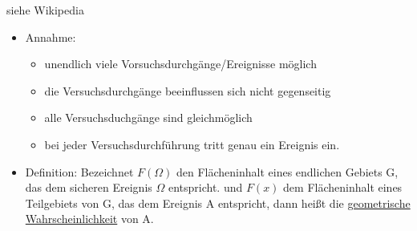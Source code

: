\documentclass{../tudscript}
\begin{document}
siehe Wikipedia

\begin{itemize}
\item Annahme:
\begin{itemize}
\item unendlich viele Vorsuchsdurchgänge/Ereignisse möglich
\item die Versuchsdurchgänge beeinflussen sich nicht gegenseitig
\item alle Versuchsduchgänge sind gleichmöglich
\item bei jeder Versuchsdurchführung tritt genau ein Ereignis ein.
\end{itemize}
\item Definition: Bezeichnet $F(\Omega)$ den Flächeninhalt eines endlichen Gebiets G, das dem sicheren Ereignis $\Omega$ entspricht. und $F(x)$ dem Flächeninhalt eines Teilgebiets von G, das dem Ereignis A entspricht,
dann heißt
die \underline{geometrische Wahrscheinlichkeit} von A.
\end{itemize}
\end{document}
